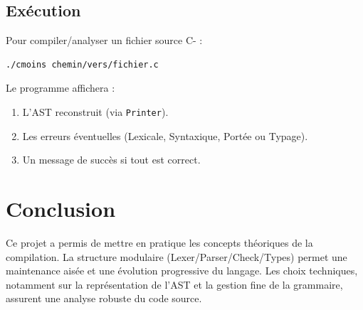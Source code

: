 \documentclass[a4paper,11pt]{article}
\begin{document}
\subsection{Exécution}
Pour compiler/analyser un fichier source C- :
\begin{verbatim}
./cmoins chemin/vers/fichier.c
\end{verbatim}

Le programme affichera :
\begin{enumerate}
    \item L'AST reconstruit (via \texttt{Printer}).
    \item Les erreurs éventuelles (Lexicale, Syntaxique, Portée ou Typage).
    \item Un message de succès si tout est correct.
\end{enumerate}

\section{Conclusion}
Ce projet a permis de mettre en pratique les concepts théoriques de la compilation. La structure modulaire (Lexer/Parser/Check/Types) permet une maintenance aisée et une évolution progressive du langage. Les choix techniques, notamment sur la représentation de l'AST et la gestion fine de la grammaire, assurent une analyse robuste du code source.
\end{document}
